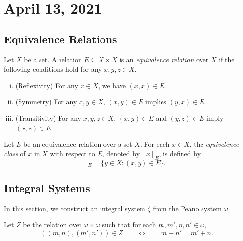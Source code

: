 \documentclass[11pt]{article}
\begin{document}
\section{April 13, 2021}
\subsection{Equivalence Relations}
\begin{definition}
  Let $X$ be a set.
  A relation $E \subseteq X \times X$ is an \emph{equivalence relation} over $X$ if the following conditions hold for any $x, y, z \in X$.
  \begin{enumerate}[(i)]
    \item (Reflexivity) For any $x \in X$, we have $(x, x) \in E$.
    \item (Symmetry) For any $x, y \in X$, $(x, y) \in E$ implies $(y, x) \in E$.
    \item (Transitivity) For any $x, y, z \in X$, $(x, y) \in E$ and $(y, z) \in E$ imply $(x, z) \in E$.
  \end{enumerate}
\end{definition}

\begin{definition}
  Let $E$ be an equivalence relation over a set $X$.
  For each $x \in X$, the \emph{equivalence class} of $x$ in $X$ with respect to $E$, denoted by $[x]_E$, is defined by
  \begin{equation*}
    [x]_E = \{y \in X: (x, y) \in E\}.
  \end{equation*}
\end{definition}

\subsection{Integral Systems}
In this section, we construct an integral system $\zeta$ from the Peano system $\omega$.

\begin{definition}
  Let $Z$ be the relation over $\omega \times \omega$ such that
  for each $m, m', n, n' \in \omega$,
  \begin{equation*}
    ((m, n), (m', n')) \in Z \qquad \iff \qquad m + n' = m' + n.
  \end{equation*}
\end{definition}
\end{document}

